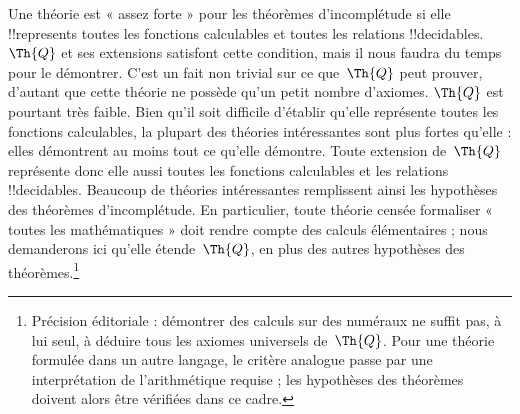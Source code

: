 \documentclass[../../../include/open-logic-section]{subfiles}
\begin{document}
Une théorie est « assez forte » pour les théorèmes d'incomplétude si
elle !!{represents} toutes les fonctions calculables et toutes les
relations !!{decidable}s. $\Th{Q}$ et ses extensions satisfont cette
condition, mais il nous faudra du temps pour le démontrer. C'est un
fait non trivial sur ce que~$\Th{Q}$ peut prouver, d'autant que cette
théorie ne possède qu'un petit nombre d'axiomes. $\Th{Q}$ est
pourtant très faible. Bien qu'il soit difficile d'établir qu'elle
représente toutes les fonctions calculables, la plupart des théories
intéressantes sont plus fortes qu'elle : elles démontrent au moins
tout ce qu'elle démontre. Toute extension de~$\Th{Q}$ représente donc
elle aussi toutes les fonctions calculables et les relations
!!{decidable}s. Beaucoup de théories intéressantes remplissent
ainsi les hypothèses des théorèmes d'incomplétude. En particulier,
toute théorie censée formaliser « toutes les mathématiques » doit
rendre compte des calculs élémentaires ; nous demanderons ici qu'elle
étende~$\Th{Q}$, en plus des autres hypothèses des théorèmes.\footnote{Précision éditoriale : démontrer des calculs sur des numéraux ne suffit pas, à lui seul, à déduire tous les axiomes universels de~$\Th{Q}$. Pour une théorie formulée dans un autre langage, le critère analogue passe par une interprétation de l'arithmétique requise ; les hypothèses des théorèmes doivent alors être vérifiées dans ce cadre.}
\end{document}
